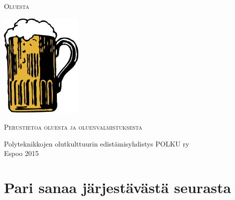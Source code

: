 \documentclass[a4paper,11pt]{report}
\begin{document}
\begin{titlepage}
	\centering
	{\scshape\Huge Oluesta \par}
	\vspace{5cm}
	\includegraphics[width=0.3\textwidth]{mugbeer}\par\vspace{1cm}

	{\scshape\Large Perustietoa oluesta ja oluenvalmistuksesta\par}

	\vfill
	
	{\large Polyteknikkojen olutkulttuurin edistämisyhdistys POLKU ry \\ Espoo 2015}
\end{titlepage}
\newpage\null\thispagestyle{empty}

\tableofcontents

\chapter{Pari sanaa järjestävästä seurasta}


\end{document}
